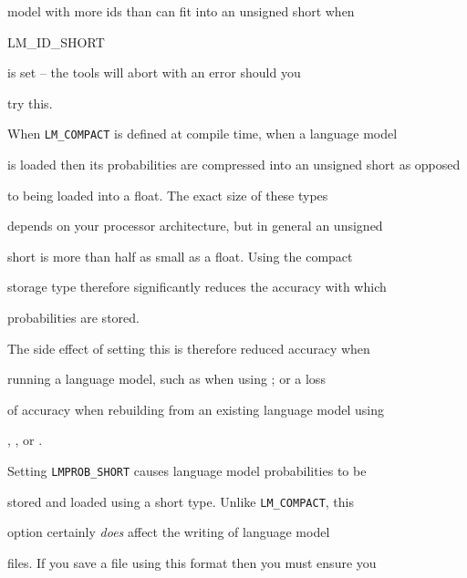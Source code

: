 model with more ids than can fit into an unsigned short when {\tt


LM\_ID\_SHORT} is set -- the tools will abort with an error should you


try this.













When {\tt LM\_COMPACT} is defined at compile time, when a language model


is loaded then its probabilities are compressed into an unsigned short as opposed


to being loaded into a float.  The exact size of these types


depends on your processor architecture, but in general an unsigned


short is more than half as small as a float.  Using the compact


storage type therefore significantly reduces the accuracy with which


probabilities are stored.





The side effect of setting this is therefore reduced accuracy when


running a language model, such as when using ; or a loss


of accuracy when rebuilding from an existing language model using


, ,  or .













Setting {\tt LMPROB\_SHORT} causes language model probabilities to be


stored and loaded using a short type.  Unlike {\tt LM\_COMPACT}, this


option certainly {\it does} affect the writing of language model


files.  If you save a file using this format then you must ensure you



